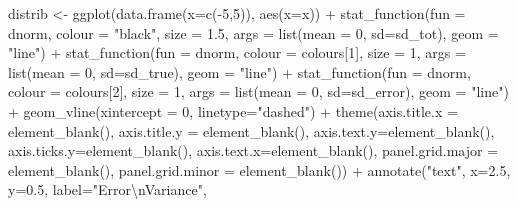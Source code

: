 \documentclass[
]{article}
\newenvironment{Shaded}{\begin{snugshade}}{\end{snugshade}}
\newcommand{\AttributeTok}[1]{\textcolor[rgb]{0.77,0.63,0.00}{#1}}
\newcommand{\DecValTok}[1]{\textcolor[rgb]{0.00,0.00,0.81}{#1}}
\newcommand{\FloatTok}[1]{\textcolor[rgb]{0.00,0.00,0.81}{#1}}
\newcommand{\FunctionTok}[1]{\textcolor[rgb]{0.00,0.00,0.00}{#1}}
\newcommand{\NormalTok}[1]{#1}
\newcommand{\OtherTok}[1]{\textcolor[rgb]{0.56,0.35,0.01}{#1}}
\newcommand{\SpecialCharTok}[1]{\textcolor[rgb]{0.00,0.00,0.00}{#1}}
\newcommand{\StringTok}[1]{\textcolor[rgb]{0.31,0.60,0.02}{#1}}
\begin{document}
\begin{Shaded}
\begin{Highlighting}[]
\NormalTok{  distrib }\OtherTok{\textless{}{-}} \FunctionTok{ggplot}\NormalTok{(}\FunctionTok{data.frame}\NormalTok{(}\AttributeTok{x=}\FunctionTok{c}\NormalTok{(}\SpecialCharTok{{-}}\DecValTok{5}\NormalTok{,}\DecValTok{5}\NormalTok{)), }\FunctionTok{aes}\NormalTok{(}\AttributeTok{x=}\NormalTok{x)) }\SpecialCharTok{+}
      \FunctionTok{stat\_function}\NormalTok{(}\AttributeTok{fun =}\NormalTok{ dnorm, }
        \AttributeTok{colour =} \StringTok{"black"}\NormalTok{, }\AttributeTok{size =} \FloatTok{1.5}\NormalTok{, }\AttributeTok{args =} \FunctionTok{list}\NormalTok{(}\AttributeTok{mean =} \DecValTok{0}\NormalTok{, }\AttributeTok{sd=}\NormalTok{sd\_tot), }
        \AttributeTok{geom =} \StringTok{"line"}\NormalTok{) }\SpecialCharTok{+}
    \FunctionTok{stat\_function}\NormalTok{(}\AttributeTok{fun =}\NormalTok{ dnorm, }
        \AttributeTok{colour =}\NormalTok{ colours[}\DecValTok{1}\NormalTok{], }\AttributeTok{size =} \DecValTok{1}\NormalTok{, }\AttributeTok{args =} \FunctionTok{list}\NormalTok{(}\AttributeTok{mean =} \DecValTok{0}\NormalTok{, }\AttributeTok{sd=}\NormalTok{sd\_true), }
        \AttributeTok{geom =} \StringTok{"line"}\NormalTok{) }\SpecialCharTok{+}
    \FunctionTok{stat\_function}\NormalTok{(}\AttributeTok{fun =}\NormalTok{ dnorm, }
        \AttributeTok{colour =}\NormalTok{ colours[}\DecValTok{2}\NormalTok{], }\AttributeTok{size =} \DecValTok{1}\NormalTok{, }\AttributeTok{args =} \FunctionTok{list}\NormalTok{(}\AttributeTok{mean =} \DecValTok{0}\NormalTok{, }\AttributeTok{sd=}\NormalTok{sd\_error), }
        \AttributeTok{geom =} \StringTok{"line"}\NormalTok{) }\SpecialCharTok{+}
    \FunctionTok{geom\_vline}\NormalTok{(}\AttributeTok{xintercept =} \DecValTok{0}\NormalTok{, }\AttributeTok{linetype=}\StringTok{"dashed"}\NormalTok{) }\SpecialCharTok{+}
    \FunctionTok{theme}\NormalTok{(}\AttributeTok{axis.title.x =} \FunctionTok{element\_blank}\NormalTok{(),}
          \AttributeTok{axis.title.y =} \FunctionTok{element\_blank}\NormalTok{(),}
          \AttributeTok{axis.text.y=}\FunctionTok{element\_blank}\NormalTok{(),}
          \AttributeTok{axis.ticks.y=}\FunctionTok{element\_blank}\NormalTok{(),}
          \AttributeTok{axis.text.x=}\FunctionTok{element\_blank}\NormalTok{(),}
          \AttributeTok{panel.grid.major =} \FunctionTok{element\_blank}\NormalTok{(), }
          \AttributeTok{panel.grid.minor =} \FunctionTok{element\_blank}\NormalTok{()) }\SpecialCharTok{+}
    \FunctionTok{annotate}\NormalTok{(}\StringTok{"text"}\NormalTok{, }\AttributeTok{x=}\FloatTok{2.5}\NormalTok{, }\AttributeTok{y=}\FloatTok{0.5}\NormalTok{, }
           \AttributeTok{label=}\StringTok{"Error}\SpecialCharTok{\textbackslash{}n}\StringTok{Variance"}\NormalTok{,}

\end{Highlighting}
\end{Shaded}
\end{document}
